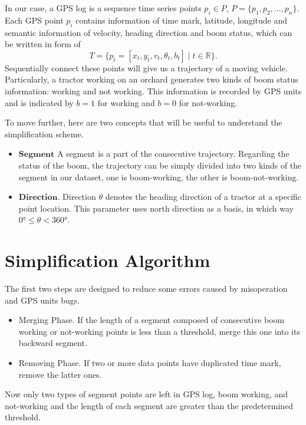 In our case, a GPS log is a sequence time series points $p_i \in P$, $P=\{ p_1,p_2, \ldots, p_n \}$. Each GPS point $p_i$ contains information of time mark, latitude, longitude and semantic information of velocity, heading direction and boom status, which can be written in form of
\begin{equation}
T=\{p_t=[x_t,y_t,v_t,\theta_t,b_t] \mid t \in \mathbb{R} \}.
\end{equation}
Sequentially connect these points will give us a trajectory of a moving vehicle.
Particularly, a tractor working on an orchard generates two kinds of boom status information: working and not working. This information is recorded by GPS units and is indicated by $b=1$ for working and $b=0$ for not-working.


To move further, here are two concepts that will be useful to understand the simplification scheme.
\begin{itemize}
\item $\mathbf{Segment}$ A segment is a part of the consecutive trajectory. Regarding the status of the boom, the trajectory can be simply divided into two kinds of the segment in our dataset, one is boom-working, the other is boom-not-working. 
\item $\mathbf{Direction}$. Direction $\theta$ denotes the heading direction of a tractor at a specific point location. This parameter uses north direction as a basis, in which way $\ang{0} \leq \theta < \ang{360}$.
\end{itemize}



\section{Simplification Algorithm}

The first two steps are designed to reduce some errors caused by misoperation and GPS units bugs.
\begin{itemize}
\item Merging Phase. If the length of a segment composed of consecutive boom working or not-working points is less than a threshold, merge this one into its backward segment. 
\item Removing Phase. If two or more data points have duplicated time mark, remove the latter ones. 
\end{itemize}
Now only two types of segment points are left in GPS log, boom working, and not-working and the length of each segment are greater than the predetermined threshold.

